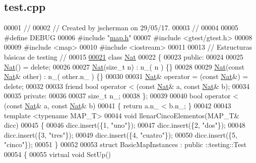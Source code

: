 \hypertarget{test_8cpp_source}{}\subsection{test.\+cpp}

\begin{DoxyCode}
00001 \textcolor{comment}{//}
00002 \textcolor{comment}{// Created by jscherman on 29/05/17.}
00003 \textcolor{comment}{//}
00004 
00005 \textcolor{preprocessor}{#define DEBUG}
00006 \textcolor{preprocessor}{#include "\hyperlink{map_8h}{map.h}"}
00007 \textcolor{preprocessor}{#include <gtest/gtest.h>}
00008 
00009 \textcolor{preprocessor}{#include <map>}
00010 \textcolor{preprocessor}{#include <iostream>}
00011 
00013 \textcolor{comment}{// Estructuras básicas de testing //}
00015 \textcolor{comment}{}
\hypertarget{test_8cpp_source.tex_l00021}{}\hyperlink{classNat}{00021} \textcolor{keyword}{class }\hyperlink{classNat}{Nat}
00022 \{
00023 \textcolor{keyword}{public}:
00024 
00025     \hyperlink{classNat}{Nat}() = \textcolor{keyword}{delete};
00026 
00027     \hyperlink{classNat}{Nat}(\textcolor{keywordtype}{size\_t} n) : n\_( n ) \{\}
00028 
00029     \hyperlink{classNat}{Nat}(\textcolor{keyword}{const} \hyperlink{classNat}{Nat}& other) : n\_( other.n\_ ) \{\}
00030 
00031     \hyperlink{classNat}{Nat}& operator = (\textcolor{keyword}{const} \hyperlink{classNat}{Nat}&) = \textcolor{keyword}{delete};
00032 
00033     \textcolor{keyword}{friend} \textcolor{keywordtype}{bool} operator < (\textcolor{keyword}{const} \hyperlink{classNat}{Nat}& a, \textcolor{keyword}{const} \hyperlink{classNat}{Nat}& b);
00034 
00035 \textcolor{keyword}{private}:
00036 
00037     \textcolor{keywordtype}{size\_t} n\_;
00038 \};
00039 
00040 \textcolor{keywordtype}{bool} operator < (\textcolor{keyword}{const} \hyperlink{classNat}{Nat}& a, \textcolor{keyword}{const} \hyperlink{classNat}{Nat}& b)
00041 \{ \textcolor{keywordflow}{return} a.n\_ < b.n\_; \}
00042 
00043 \textcolor{keyword}{template} <\textcolor{keyword}{typename} MAP\_T>
00044 \textcolor{keywordtype}{void} llenarCincoElementos(MAP\_T& dicc)
00045 \{
00046     dicc.insert(\{1, \textcolor{stringliteral}{"uno"}\});
00047     dicc.insert(\{2, \textcolor{stringliteral}{"dos"}\});
00048     dicc.insert(\{3, \textcolor{stringliteral}{"tres"}\});
00049     dicc.insert(\{4, \textcolor{stringliteral}{"cuatro"}\});
00050     dicc.insert(\{5, \textcolor{stringliteral}{"cinco"}\});
00051 \}
00052 
00053 \textcolor{keyword}{struct }BasicMapInstances : \textcolor{keyword}{public} ::testing::Test
00054 \{
00055     \textcolor{keyword}{virtual} \textcolor{keywordtype}{void} SetUp()

\end{DoxyCode}
